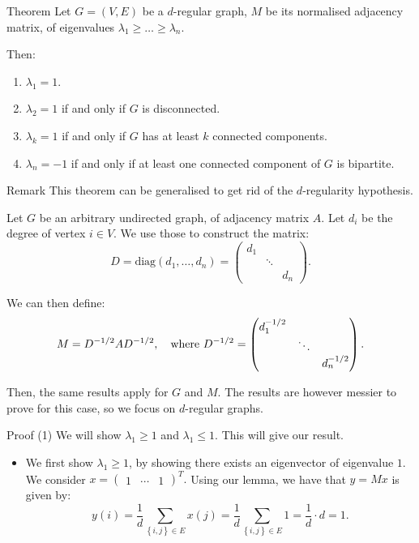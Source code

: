 \documentclass[a4paper]{article}
\begin{document}
\begin{parag}{Theorem}
    Let $G = \left(V, E\right)$ be a $d$-regular graph, $M$ be its normalised adjacency matrix, of eigenvalues $\lambda_1 \geq \ldots \geq \lambda_n$.

    Then:
    \begin{enumerate}
        \item $\lambda_1 = 1$.
        \item $\lambda_2 = 1$ if and only if $G$ is disconnected.
        \item $\lambda_k = 1$ if and only if $G$ has at least $k$ connected components.
        \item $\lambda_n = -1$ if and only if at least one connected component of $G$ is bipartite.
    \end{enumerate}

    \begin{subparag}{Remark}
        This theorem can be generalised to get rid of the $d$-regularity hypothesis.

        Let $G$ be an arbitrary undirected graph, of adjacency matrix $A$. Let $d_i$ be the degree of vertex $i \in V$. We use those to construct the matrix: 
        \[D = \text{diag}\left(d_1, \ldots, d_n\right) = \begin{pmatrix} d_1 &  &  \\  & \ddots &  \\  &  & d_n \end{pmatrix}.\]

        We can then define: 
        \[M = D^{-1/2} A D^{-1/2}, \quad \text{where } D^{-1/2} = \begin{pmatrix} d_1^{-1/2} &  &  \\  & \ddots &  \\  &  & d_n^{-1/2}\end{pmatrix}.\]

        Then, the same results apply for $G$ and $M$. The results are however messier to prove for this case, so we focus on $d$-regular graphs.
    \end{subparag}
    
    \begin{subparag}{Proof (1)}
        We will show $\lambda_1 \geq 1$ and $\lambda_1 \leq 1$. This will give our result.

        \begin{itemize}[left=0pt]
            \item We first show $\lambda_1 \geq 1$, by showing there exists an eigenvector of eigenvalue $1$. We consider $x = \begin{pmatrix} 1 & \cdots & 1 \end{pmatrix}^T.$ Using our lemma, we have that $y = Mx$ is given by: 
            \[y\left(i\right) = \frac{1}{d} \sum_{\left\{i, j\right\} \in E} x\left(j\right) = \frac{1}{d} \sum_{\left\{i, j\right\} \in E} 1 = \frac{1}{d}\cdot d = 1.\]


\end{itemize}
\end{subparag}
\end{parag}
\end{document}
